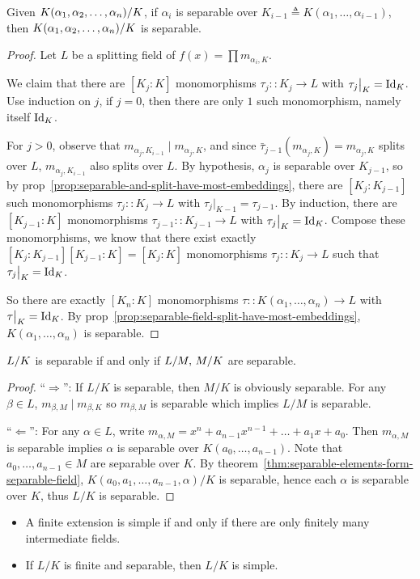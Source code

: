 \begin{theorem} \label{thm:separable-elements-form-separable-field}
  Given ${K(\alpha_1, \alpha_2, \dots, \alpha_n)}/{K}$, if $\alpha_i$ is
  separable over $K_{i-1} \triangleq K(\alpha_1, \dots, \alpha_{i-1})$, then
  ${K(\alpha_1, \alpha_2, \dots, \alpha_n)}/{K}$ is separable.

  \begin{proof}
    Let $L$ be a splitting field of $f(x) = \prod m_{\alpha_i, K}$.

    We claim that there are $[K_j: K]$ monomorphisms $\tau_j:: K_j \to L$ with $\tau_j \big|_K = {\rm Id}_K$.
    Use induction on $j$, if $j = 0$, then there are only $1$ such monomorphism, namely itself ${\rm Id}_K$.

    For $j > 0$, observe that $m_{\alpha_j, K_{i-1}} \mid m_{\alpha_j, K}$, and since $\bar\tau_{j-1}
    (m_{\alpha_j, K}) = m_{\alpha_j, K}$ splits over $L$, $m_{\alpha_j, K_{i-1}}$ also splits over $L$.
    By hypothesis, $\alpha_j$ is separable over $K_{j-1}$, so by
    prop~\ref{prop:separable-and-split-have-most-embeddings},
    there are $[K_j: K_{j-1}]$ such monomorphisms $\tau_j:: K_j \to L$ with $\tau_j \big|_{K-1} = \tau_{j-1}$.
    By induction, there are $[K_{j-1}: K]$ monomorphisms $\tau_{j-1}:: K_{j-1} \to L$
    with $\tau_j \big|_K = {\rm Id}_K$. Compose these monomorphisms, we know that there
    exist exactly $[K_j: K_{j-1}][K_{j-1}: K] = [K_j: K]$ monomorphisms $\tau_j:: K_j \to L$
    such that $\tau_j \big|_K = {\rm Id}_K$.

    So there are exactly $[K_n: K]$ monomorphisms $\tau :: K(\alpha_1, \dots, \alpha_n) \to L$
    with $\tau\big|_K = {\rm Id}_K$.
    By prop~\ref{prop:separable-field-split-have-most-embeddings}, $K(\alpha_1, \dots, \alpha_n)$ is separable.
  \end{proof}
\end{theorem}

\begin{theorem}
  ${L}/{K}$ is separable if and only if ${L}/{M},\, {M}/{K}$ are separable.

  \begin{proof}
    ``$\Rightarrow$'': If $L/K$ is separable, then $M/K$ is obviously separable. For any $\beta \in L$,
    $m_{\beta, M} \mid m_{\beta, K}$ so $m_{\beta, M}$ is separable which implies $L/M$ is separable.

    ``$\Leftarrow$'': For any $\alpha \in L$, write $m_{\alpha, M} = x^n + a_{n-1}x^{n-1} + \dots + a_1 x + a_0$.
    Then $m_{\alpha, M}$ is separable implies $\alpha$ is separable over $K(a_0, \dots, a_{n-1})$.
    Note that $a_0, \dots, a_{n-1} \in M$ are separable over $K$.
    By theorem~\ref{thm:separable-elements-form-separable-field},
    $K(a_0, a_1, \dots, a_{n-1}, \alpha) / K$ is separable, hence each $\alpha$ is separable over $K$,
    thus $L/K$ is separable.
  \end{proof}
\end{theorem}

\begin{theorem} \hfill
  \begin{itemize}
    \item A finite extension is simple if and only if there are only finitely many intermediate fields.
    \item If $L/K$ is finite and separable, then $L/K$ is simple.
  \end{itemize}
\end{theorem}
